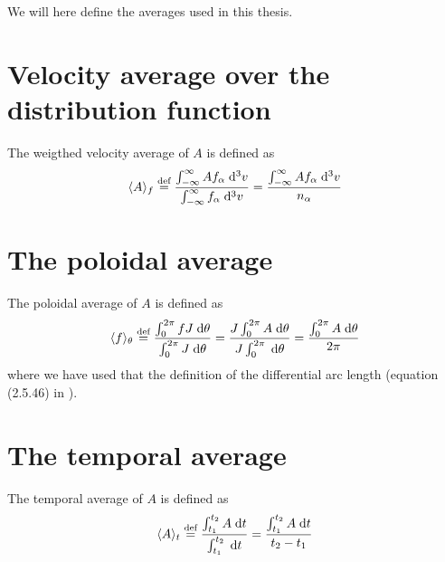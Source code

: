 %
We will here define the averages used in this thesis.
%
\section{Velocity average over the distribution function}
%
The weigthed velocity average of $A$ is defined as
%
\begin{align}
    \langle{A}\rangle_{f} \overset{\text{def}}{=}
        \frac{
            \int_{-\infty}^{\infty} {Af_\alpha} \; \text{d} {^3v}
        }{
            \int_{-\infty}^{\infty} {f_\alpha} \; \text{d} {^3v}
        }
    =
        \frac{\int_{-\infty}^{\infty} {Af_\alpha} \; \text{d} {^3v}}{n_\alpha}
    \label{app:distAvg}
\end{align}


\section{The poloidal average}
\label{sec:polAvg}
%
The poloidal average of $A$ is defined as
%
\begin{align*}
    \langle{f}\rangle_\theta \overset{\text{def}}{=}
        \frac{
            \int_{0}^{2\pi} {fJ} \; \text{d} {\theta}
        }{
            \int_{0}^{2\pi} {J} \; \text{d} {\theta}
        }
    =
        \frac{
            J\int_{0}^{2\pi} {A} \; \text{d} {\theta}
        }{
            J\int_{0}^{2\pi} {} \; \text{d} {\theta}
        }
    =
        \frac{\int_{0}^{2\pi} {A} \; \text{d} {\theta}}{2\pi}
\end{align*}
%
where we have used that the definition of the differential arc length (equation (2.5.46) in \cite{Dhaeseleer1991book}).

\section{The temporal average}
%
The temporal average of $A$ is defined as
%
\begin{align*}
    \langle{A}\rangle_t \overset{\text{def}}{=}
        \frac{
            \int_{t_1}^{t_2} {A} \; \text{d} {t}
        }{
            \int_{t_1}^{t_2} {} \; \text{d} {t}
        }
    =
        \frac{\int_{t_1}^{t_2} {A} \; \text{d} {t}}{t_2-t_1}
\end{align*}
